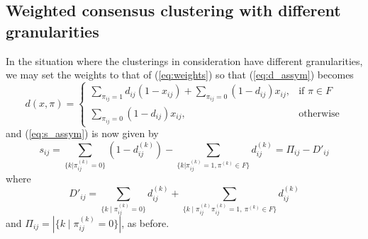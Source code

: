 \documentclass[a4paper,UKenglish]{lipics-v2016}
\begin{document}
\subsection{Weighted consensus clustering with different granularities}
In the situation where the clusterings in consideration have different granularities, we may set the weights to that of (\ref{eq:weights}) so that (\ref{eq:d_assym}) becomes
\begin{equation}
d(x,\pi) = \begin{cases}  \sum_{\pi_{ij} = 1} d_{ij}(1 - x_{ij}) + \sum_{\pi_{ij} = 0}(1-d_{ij}) x_{ij},& \text{if } \pi \in F\\
    \sum_{\pi_{ij} = 0}(1-d_{ij}) x_{ij}, & \text{otherwise}
\end{cases}
\end{equation}
and (\ref{eq:s_assym}) is now given by
\begin{equation} \label{eq:s_assym}
s_{ij} = \sum_{\{k | \pi^{(k)}_{ij} = 0 \}} \left( 1-d^{(k)}_{ij} \right) - \sum_{\{k | \pi^{(k)}_{ij} = 1, \pi^{(k)} \in F\}} d^{(k)}_{ij} = \Pi_{ij} - D'_{ij}
\end{equation}
where 
$$
D'_{ij} = \sum_{ \{k \mid \pi_{ij}^{(k)} = 0 \}} d_{ij}^{(k)} + \sum_{ \{k \mid \pi_{ij}^{(k)} \pi_{ij}^{(k)} = 1,\ \pi^{(k)} \in F \} } d_{ij}^{(k)}
$$
and $\Pi_{ij} = |\{ k \mid \pi_{ij}^{(k)} = 0 \}|$, as before. 
% 

\end{document}
